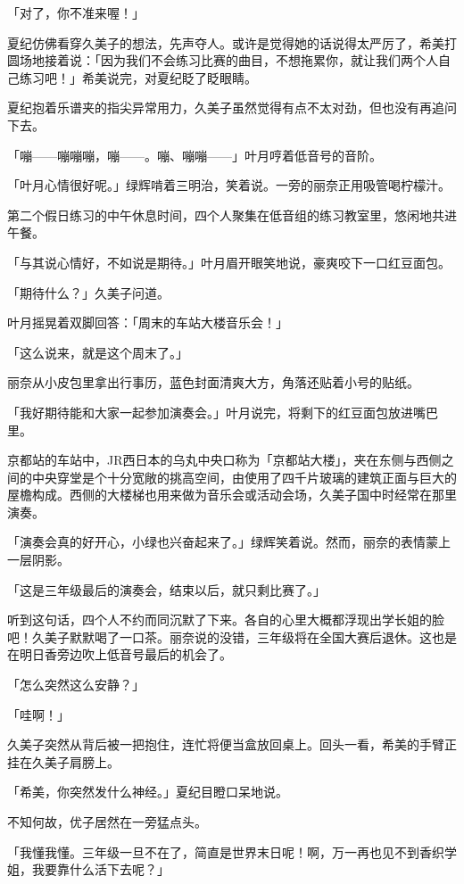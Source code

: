 \documentclass[UTF8]{ctexart}
\begin{document}
    「对了，你不准来喔！」 

    夏纪仿佛看穿久美子的想法，先声夺人。或许是觉得她的话说得太严厉了，希美打圆场地接着说：「因为我们不会练习比赛的曲目，不想拖累你，就让我们两个人自己练习吧！」希美说完，对夏纪眨了眨眼睛。 

    夏纪抱着乐谱夹的指尖异常用力，久美子虽然觉得有点不太对劲，但也没有再追问下去。 

    「嘣——嘣嘣嘣，嘣——。嘣、嘣嘣——」叶月哼着低音号的音阶。 

    「叶月心情很好呢。」绿辉啃着三明治，笑着说。一旁的丽奈正用吸管喝柠檬汁。 

    第二个假日练习的中午休息时间，四个人聚集在低音组的练习教室里，悠闲地共进午餐。 

    「与其说心情好，不如说是期待。」叶月眉开眼笑地说，豪爽咬下一口红豆面包。 

    「期待什么？」久美子问道。 

    叶月摇晃着双脚回答：「周末的车站大楼音乐会！」 

    「这么说来，就是这个周末了。」 

    丽奈从小皮包里拿出行事历，蓝色封面清爽大方，角落还贴着小号的贴纸。 

    「我好期待能和大家一起参加演奏会。」叶月说完，将剩下的红豆面包放进嘴巴里。 

    京都站的车站中，JR西日本的乌丸中央口称为「京都站大楼」，夹在东侧与西侧之间的中央穿堂是个十分宽敞的挑高空间，由使用了四千片玻璃的建筑正面与巨大的屋檐构成。西侧的大楼梯也用来做为音乐会或活动会场，久美子国中时经常在那里演奏。 

    「演奏会真的好开心，小绿也兴奋起来了。」绿辉笑着说。然而，丽奈的表情蒙上一层阴影。 

    「这是三年级最后的演奏会，结束以后，就只剩比赛了。」 

    听到这句话，四个人不约而同沉默了下来。各自的心里大概都浮现出学长姐的脸吧！久美子默默喝了一口茶。丽奈说的没错，三年级将在全国大赛后退休。这也是在明日香旁边吹上低音号最后的机会了。 

    「怎么突然这么安静？」 

    「哇啊！」 

    久美子突然从背后被一把抱住，连忙将便当盒放回桌上。回头一看，希美的手臂正挂在久美子肩膀上。 

    「希美，你突然发什么神经。」夏纪目瞪口呆地说。 

    不知何故，优子居然在一旁猛点头。 

    「我懂我懂。三年级一旦不在了，简直是世界末日呢！啊，万一再也见不到香织学姐，我要靠什么活下去呢？」 
\end{document}
